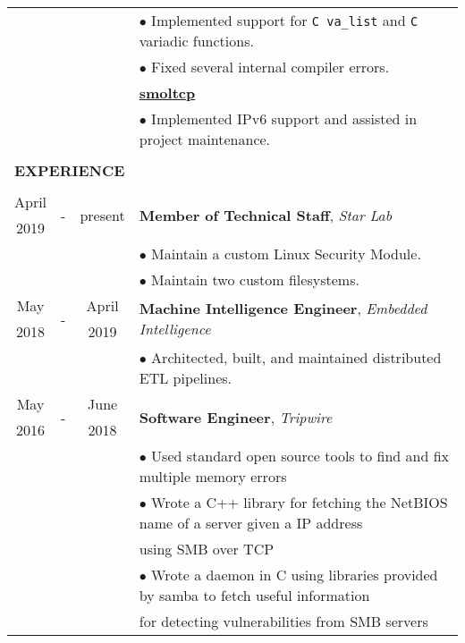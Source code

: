 \documentclass[10pt]{article}
\begin{document}
\begin{table}[ht]
\begin{tabular}{@{\hspace{0mm}}c@{\hspace{1mm}}c@{\hspace{3mm}}cl}
            & & & $\bullet$ Implemented support for \texttt{C va\_list} and \texttt{C} variadic functions.\\[2mm]
            & & & $\bullet$ Fixed several internal compiler errors.\\[2mm]
            & & & \textbf{\href{https://github.com/m-labs/smoltcp}{smoltcp}}\\
            & & & $\bullet$ Implemented IPv6 support and assisted in project maintenance.\\[2mm]
            \hline\\[-3mm]
            \multicolumn{4}{l}{\large{\textbf{EXPERIENCE}}}\\
            \hline\\[-2mm]
            April & \multirow{2}{*}{-} & \multirow{2}{*}{present} & \multirow{2}{*}{\textbf{Member of Technical Staff}, \textit{Star Lab}}\\
            2019 & & &\\
            & & & $\bullet$ Maintain a custom Linux Security Module.\\
            & & & $\bullet$ Maintain two custom filesystems.\\
            May & \multirow{2}{*}{-} & April & \multirow{2}{*}{\textbf{Machine Intelligence Engineer}, \textit{Embedded Intelligence}}\\
            2018 & & 2019 &\\
            & & & $\bullet$ Architected, built, and maintained distributed ETL pipelines.\\
            May & \multirow{2}{*}{-} & June & \multirow{2}{*}{\textbf{Software Engineer}, \textit{Tripwire}}\\
            2016 & & 2018 &\\
            & & & $\bullet$ Used standard open source tools to find and fix multiple memory errors\\
            & & & $\bullet$ Wrote a C++ library for fetching the NetBIOS name of a server given a IP address\\
            & & & \hspace*{4mm}using SMB over TCP\\
            & & & $\bullet$ Wrote a daemon in C using libraries provided by samba to fetch useful information\\
            & & & \hspace*{4mm}for detecting vulnerabilities from SMB servers\\

\end{tabular}
\end{table}
\end{document}

